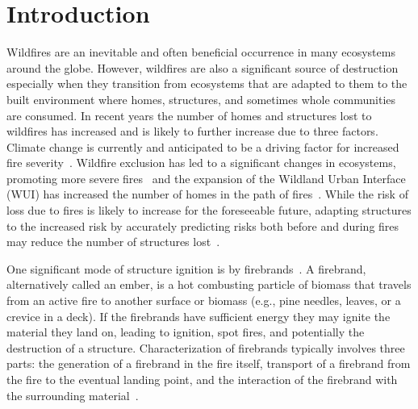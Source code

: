 
\chapter{Introduction}
\label{part:intro}
    Wildfires are an inevitable and often beneficial occurrence in many ecosystems around the globe. However, wildfires are also a significant source of destruction especially when they transition from ecosystems that are adapted to them to the built environment where homes, structures, and sometimes whole communities are consumed.  In recent years the number of homes and structures lost to wildfires has increased and is likely to further increase due to three factors. Climate change is currently and anticipated to be a driving factor for increased fire severity~\cite{Levin2021Unveiling2019/2020}. Wildfire exclusion has led to a significant changes in ecosystems, promoting more severe fires~\cite{Marlon2012Long-termUSA, Keeley2019} and the expansion of the Wildland Urban Interface (WUI) has increased the number of homes in the path of fires~\cite{Radeloff2018RapidRisk, Hammer2009DemographicManagement, }. While the risk of loss due to fires is likely to increase for the foreseeable future, adapting structures to the increased risk by accurately predicting risks both before and during fires may reduce the number of structures lost~\cite{Manzello2021}. 
    
    One significant mode of structure ignition is by firebrands~\cite{Manzello2020}. A firebrand, alternatively called an ember, is a hot combusting particle of biomass that travels from an active fire to another surface or biomass (e.g., pine needles, leaves, or a crevice in a deck). If the firebrands have sufficient energy they  may ignite the material they land on, leading to ignition, spot fires, and potentially the destruction of a structure. Characterization of firebrands typically involves three parts: the generation of a firebrand in the fire itself, transport of a firebrand from the fire to the eventual landing point, and the interaction of the firebrand with the surrounding material~\cite{Babrauskas2003}. 
    
